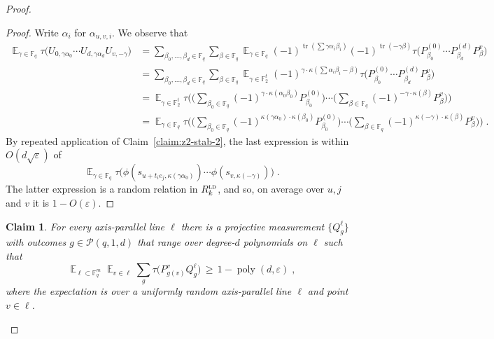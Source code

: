 \documentclass[11pt]{article}
\newtheorem{claim}[theorem]{Claim}
\theoremstyle{definition}
\DeclareMathOperator*{\Expectation}{\mathbb{E}}
\newcommand{\Es}[1]{\Expectation_{#1}}
\newcommand{\F}{\ensuremath{\mathbb{F}}}
\newcommand{\ld}{\textsc{ld}}
\DeclareMathOperator{\poly}{poly}
\newcommand{\eps}{\varepsilon}
\DeclareMathOperator{\tr}{tr}
\renewcommand{\cal}[1]{\mathcal{#1}}
\begin{document}
\begin{proof}
\begin{proof}
Write $\alpha_i$ for $\alpha_{u,v,i}$. 
We observe that 
\begin{align*}
\Es{\gamma\in\F_q} \tau\big( U_{0,\gamma\alpha_{0}}\cdots U_{d,\gamma\alpha_{d}} U_{v,-\gamma} \big)
&=  \sum_{\beta_0,\ldots,\beta_d\in\F_q}\sum_{\beta\in\F_q} \Es{\gamma\in\F_q} (-1)^{\tr(\sum \gamma \alpha_i\beta_i)} (-1)^{\tr(-\gamma\beta)} \tau\big( P^{(0)}_{\beta_0} \cdots P^{(d)}_{\beta_d} P^v_\beta \big)\\
&= \sum_{\beta_0,\ldots,\beta_d\in\F_q}\sum_{\beta\in\F_q}\Es{\gamma\in\F_2^t} (-1)^{\gamma\cdot \kappa(\sum \alpha_i\beta_i-\beta)} \tau\big( P^{(0)}_{\beta_0} \cdots P^{(d)}_{\beta_d} P^v_\beta \big)\\
&=\Es{\gamma\in\F_2^t}  \tau\Big( \Big(\sum_{\beta_0\in \F_q} (-1)^{\gamma\cdot \kappa(\alpha_0\beta_0)} P^{(0)}_{\beta_0} \Big)\cdots\Big(\sum_{\beta\in \F_q} (-1)^{-\gamma\cdot \kappa(\beta)} P^{v}_{\beta} \Big)\Big)\\
&=\Es{\gamma\in\F_q}  \tau\Big( \Big(\sum_{\beta_0\in \F_q} (-1)^{\kappa( \gamma \alpha_0)\cdot\kappa(\beta_0)} P^{(0)}_{\beta_0} \Big)\cdots\Big(\sum_{\beta\in \F_q} (-1)^{\kappa(-\gamma)\cdot \kappa(\beta)} P^{v}_{\beta} \Big)\Big)\;.
\end{align*}
By repeated application of Claim~\ref{claim:z2-stab-2}, the last expression is within $O(d\sqrt{\eps})$ of 
\[ \Es{\gamma\in\F_q}  \tau\big( \phi(s_{u+t_ie_j,\kappa(\gamma \alpha_0)})\cdots \phi(s_{v,\kappa(-\gamma)}) \big)\;.\]
The latter expression is a random relation in $R^\ld_k$, and so, on average over $u,j$ and $v$ it is $1-O(\eps)$.
\end{proof}


\begin{claim}\label{claim:z2-stab-4}
For every axis-parallel line $\ell$ there is a projective measurement $\{Q^\ell_g\}$ with outcomes $g \in \cal{P}(q,1,d)$ that range over degree-$d$ polynomials on $\ell$ such that
\[ \Es{\ell\subset \F_q^m} \Es{v\in \ell} \sum_g \tau\big( P^v_{g(v)} Q^\ell_g\big) \,\geq\, 1-\poly(d,\eps)\;, \]
where the expectation is over a uniformly random axis-parallel line $\ell$ and point $v\in \ell$. 
\end{claim}


\end{proof}
\end{document}
